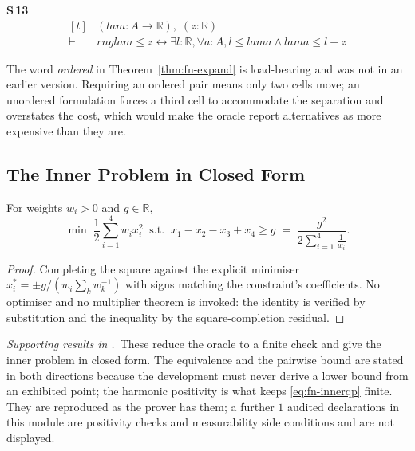 \noindent\textbf{S\,13}\quad{}
{\footnotesize\[ \begin{aligned}[t]
&(\mathit{lam} : \mathit{A} \to \mathbb{R} ),\; (\mathit{z} : \mathbb{R} )\\
\vdash\;&\mathit{rng} \mathit{lam} \leq \mathit{z} \leftrightarrow \exists \mathit{l} : \mathbb{R} , \forall \mathit{a} : \mathit{A}, \mathit{l} \leq \mathit{lam} \mathit{a} \wedge \mathit{lam} \mathit{a} \leq \mathit{l} + \mathit{z}
\end{aligned} \]}


The word \emph{ordered} in Theorem~\ref{thm:fn-expand} is load-bearing and was not in an earlier
version. Requiring an ordered pair means only two cells move; an unordered formulation forces
a third cell to accommodate the separation and overstates the cost, which would make the
oracle report alternatives as more expensive than they are.

\subsection{The Inner Problem in Closed Form}
\label{sec:fn-innerqp}

\begin{theorem}
\label{thm:fn-innerqp}
For weights $w_{i}>0$ and $g\in\mathbb{R}$,
\begin{equation}
\min\;\frac{1}{2}\sum_{i=1}^{4}w_{i}x_{i}^{2}
\;\;\text{s.t.}\;\;x_{1}-x_{2}-x_{3}+x_{4}\geq g
\;=\;
\frac{g^{2}}{2\sum_{i=1}^{4}\frac{1}{w_{i}}} .
\label{eq:fn-innerqp}
\end{equation}
\end{theorem}

\begin{proof}
Completing the square against the explicit minimiser
$x_{i}^{*}=\pm g/(w_{i}\sum_{k}w_{k}^{-1})$ with signs matching the constraint's
coefficients. No optimiser and no multiplier theorem is invoked: the identity is verified by
substitution and the inequality by the square-completion residual.
\end{proof}


\noindent\emph{Supporting results in .}~These reduce the oracle to a finite check and give the inner problem in closed form. The equivalence and the pairwise bound are stated in both directions because the development must never derive a lower bound from an exhibited point; the harmonic positivity is what keeps \eqref{eq:fn-innerqp} finite. They are reproduced as the prover has them; a further $1$ audited declarations in this module are positivity checks and measurability side conditions and are not displayed.

